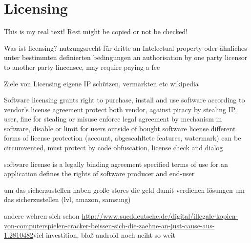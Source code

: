 \section{Licensing} \label{section:introduction-licensing}
This is my real text! Rest might be copied or not be checked!


%
Was ist licensing?
nutzungsrecht für dritte an Intelectual property oder ähnliches unter bestimmten definierten bedingungen
an authorisation by one party licensor to another party lincensee, may require paying a fee

Ziele von Licensing
eigene IP schützen, vermarkten etc
wikipedia
%

%
Software licensing grants right to purchase, install and use software according to vendor's license agreement
protect both vendor, against piracy by stealing IP, user, fine for stealing or misuse
enforce legal agreement by mechanism in software, disable or limit for users outside of bought software license
different forms of license protection (account, abgescahltete features, watermark)
can be circumvented, must protect by code obfuscation, license check and dialog
\cite{munteanLicense}
%

%
software license is a legally binding agreement
specified terms of use for an application
defines the rights of software producer and end-user
\cite{uncgLicensing}
%



um das sicherzustellen haben große stores die geld damit verdienen lösungen um das sicherzustellen (lvl, amazon, samsung)


andere wehren sich schon \url{http://www.sueddeutsche.de/digital/illegale-kopien-von-computerspielen-cracker-beissen-sich-die-zaehne-an-just-cause-aus-1.2810482}viel investition, bloß android noch nciht so weit
